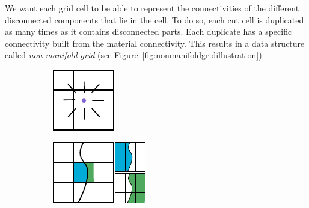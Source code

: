 We want each grid cell to be able to represent  the connectivities of the different disconnected components that lie in the cell. To do so, each cut cell is duplicated as many times as it contains disconnected parts. Each duplicate has a specific connectivity built from the material connectivity. This results in a data structure called \emph{non-manifold grid} (see Figure~\ref{fig:nonmanifoldgridillustration}).

\begin{figure}[!h]
	\centering
	\begin{subfigure}[b]{0.20\linewidth}
		\centering
		\includegraphics[width=\linewidth]{images/cutting-mig2015/connectivity.pdf}
		\caption{\label{fig:connectivity}}
	\end{subfigure}
	\hfill
	\begin{subfigure}[b]{0.30\linewidth}
		\centering
		\includegraphics[width=\linewidth]{images/cutting-mig2015/simple_cut.pdf}

\end{subfigure}
\end{figure}
